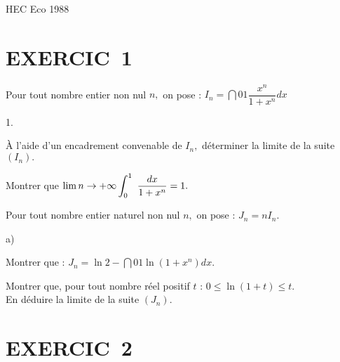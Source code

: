 \documentclass[11pt]{article}%
\begin{document}
\begin{center}
{\huge HEC Eco 1988}
\end{center}

\section*{EXERCIC\E\ 1}

Pour tout nombre entier non nul $n,$ on pose : $I_{n} =
\dint{0}{1}\dfrac{x^{n}}{1 + x^{n}}dx$

\begin{noliste}{1.}
 \setlength{\itemsep}{4mm}
\item À l'aide d'un encadrement convenable de $I_{n},$ déterminer la
limite
de la suite $(I_{n}).$

\item Montrer que $\lim{n\rightarrow + \infty }\displaystyle \int_{0}^{1}\ \dfrac{dx}{1
+ x^{n}} = 1.$

\item Pour tout nombre entier naturel non nul $n,$ on pose : $J_{n} =
nI_{n}.$

\begin{noliste}{a)}
 \setlength{\itemsep}{2mm}
\item Montrer que : $J_{n} = \ln 2-\dint{0}{1}\ln (1 + x^{n})dx.$

\item Montrer que, pour tout nombre réel positif $t$ : $0\leq \ln
(1 + t)\leq t.$\\
En déduire la limite de la suite $(J_{n}).$
\end{noliste}
\end{noliste}

\section*{EXERCIC\E\ 2}
\end{document}
